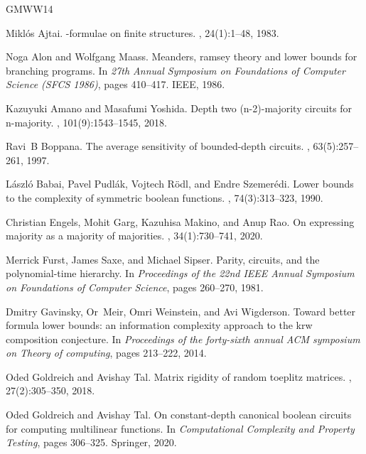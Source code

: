 \documentclass[10pt,a4paper]{article}
\theoremstyle{definition}
\theoremstyle{remark}
\begin{document}
\begin{thebibliography}{GMWW14}

Mikl{\'o}s Ajtai.
-formulae on finite structures.
, 24(1):1--48, 1983.

Noga Alon and Wolfgang Maass.
\newblock Meanders, ramsey theory and lower bounds for branching programs.
\newblock In {\em {27th Annual Symposium on Foundations of Computer Science
  (SFCS 1986)}}, pages 410--417. IEEE, 1986.

Kazuyuki Amano and Masafumi Yoshida.
\newblock Depth two (n-2)-majority circuits for n-majority.
, 101(9):1543--1545, 2018.

Ravi~B Boppana.
\newblock The average sensitivity of bounded-depth circuits.
, 63(5):257--261, 1997.

L{\'a}szl{\'o} Babai, Pavel Pudl{\'a}k, Vojtech R{\"o}dl, and Endre
  Szemer{\'e}di.
\newblock Lower bounds to the complexity of symmetric boolean functions.
, 74(3):313--323, 1990.

Christian Engels, Mohit Garg, Kazuhisa Makino, and Anup Rao.
\newblock On expressing majority as a majority of majorities.
, 34(1):730--741, 2020.

Merrick Furst, James Saxe, and Michael Sipser.
\newblock Parity, circuits, and the polynomial-time hierarchy.
\newblock In {\em Proceedings of the 22nd IEEE Annual Symposium on Foundations
  of Computer Science}, pages 260--270, 1981.

Dmitry Gavinsky, Or~Meir, Omri Weinstein, and Avi Wigderson.
\newblock Toward better formula lower bounds: an information complexity
  approach to the krw composition conjecture.
\newblock In {\em Proceedings of the forty-sixth annual ACM symposium on Theory
  of computing}, pages 213--222, 2014.

Oded Goldreich and Avishay Tal.
\newblock Matrix rigidity of random toeplitz matrices.
, 27(2):305--350, 2018.

Oded Goldreich and Avishay Tal.
\newblock On constant-depth canonical boolean circuits for computing
  multilinear functions.
\newblock In {\em Computational Complexity and Property Testing}, pages
  306--325. Springer, 2020.


\end{thebibliography}
\end{document}

